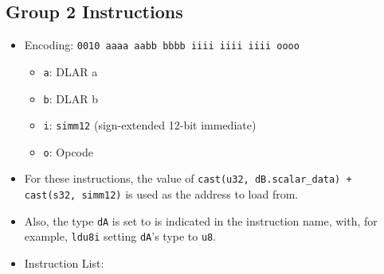 \documentclass{article}
\begin{document}
	\subsection{Group 2 Instructions}
		\begin{itemize}
		\item Encoding: \texttt{0010 aaaa aabb bbbb  iiii iiii iiii oooo}
			\begin{itemize}
			\item \texttt{a}: DLAR a
			\item \texttt{b}: DLAR b
			\item \texttt{i}: \texttt{simm12} (sign-extended 12-bit
				immediate)
			\item \texttt{o}: Opcode
			\end{itemize}
		\item For these instructions, the value of
			\texttt{cast(u32, dB.scalar\_data) + cast(s32, simm12)}
			is used as the address to load from.
		\item Also, the type \texttt{dA} is set to is indicated in the
			instruction name, with, for example, \texttt{ldu8i} setting
			\texttt{dA}'s type to \texttt{u8}.
		\item Instruction List:
			\begin{enumerate}


\end{enumerate}
\end{itemize}
\end{document}
